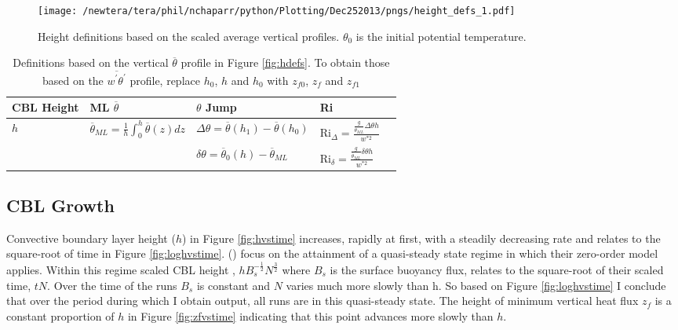 \begin{figure}[htbp]
    \centering
    \texttt{[image: /newtera/tera/phil/nchaparr/python/Plotting/Dec252013/pngs/height\_defs\_1.pdf]}
    \caption[Height definitions]{Height definitions based on the scaled average vertical profiles. $\theta_{0}$ is the initial potential temperature.}
    \label{fig:hdefs1}   %
\end{figure}

\begin{table}[htbp]
\caption[Height definitions]{Definitions based on the vertical $\overline{\theta}$ profile in Figure \ref{fig:hdefs}.  To obtain those based on the $\overline{w^{'}\theta^{'}}$ profile, replace $h_{0}$, $h$ and $h_{0}$ with $z_{f0}$, $z_{f}$ and $z_{f1}$}

    \begin{center}
    \begin{tabular}{ p{2cm} p{3.5cm}  p{3.5cm}  p{3cm} p{3cm} }
      \acs{CBL} Height & \acs{ML} $\overline{\theta}$ & $\theta$ Jump & \acs{Ri} \\ \hline 
       $h$ & $\overline{\theta}_{ML} = \frac{1}{h}\int^{h}_{0}\overline{\theta}(z)dz$ & $\Delta \theta=\overline{\theta}(h_{1})-\overline{\theta}(h_{0})$ & \acs{Ri}$_{\Delta}=\frac{\frac{g}{\overline{\theta}_{ML}}\Delta \theta h}{w^{*2}}$  \\ [.3cm] %
        
       & &$\delta \theta = \overline{\theta}_{0}(h)- \overline{\theta}_{ML}$ & \acs{Ri}$_{\delta}=\frac{\frac{g}{\overline{\theta}_{ML}} \delta \theta h}{w^{*2}}$ \\ \hline
      \end{tabular}
\label{table:reldefs}   
\end{center}    
\end{table}

\subsection{\acs{CBL} Growth}

Convective boundary layer height ($h$) in Figure \ref{fig:hvstime} increases, rapidly at first, with a steadily decreasing rate and relates to the square-root of time in Figure \ref{fig:loghvstime}.  \citeauthor{FedConzMir04} (\citeyear{FedConzMir04})
focus on the attainment of a quasi-steady state regime in which their zero-order model applies.  Within this regime scaled \acs{CBL} height , $hB_{s}^{-\frac{1}{2}}N^{\frac{3}{2}}$ where $B_{s}$ is the surface buoyancy flux, relates to the square-root of their scaled time, $tN$. Over the time of the runs $B_{s}$ is constant and $N$ varies much more slowly than h.  So based on Figure \ref{fig:loghvstime} I conclude that over the period during which I obtain output, all runs are in this quasi-steady state. The height of minimum vertical heat flux $z_{f}$ is a constant proportion of $h$ in Figure \ref{fig:zfvstime} indicating that this point advances more slowly than $h$.\\
  
